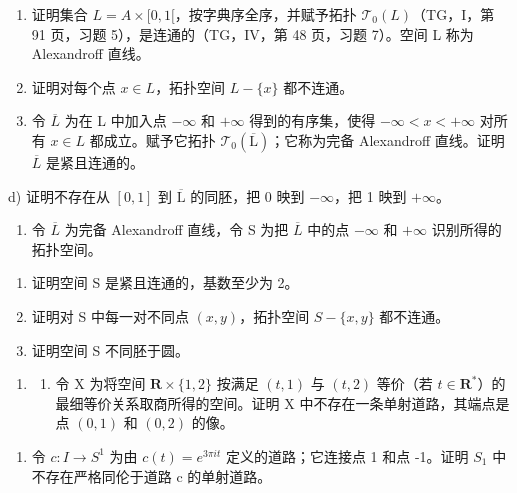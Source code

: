 \begin{enumerate}
\def\labelenumi{\alph{enumi})}
\item
  证明集合 \(L = A \times [0, 1[\)，按字典序全序，并赋予拓扑 \(\mathcal{T}_{0}(L)\)（TG，I，第 91 页，习题 5），是连通的（TG，IV，第 48 页，习题 7）。空间 L 称为 Alexandroff 直线。
\item
  证明对每个点 \(x \in L\)，拓扑空间 \(L - \{x\}\) 都不连通。
\item
  令 \(\overline{L}\) 为在 L 中加入点 \(-\infty\) 和 \(+\infty\) 得到的有序集，使得 \(-\infty < x < +\infty\) 对所有 \(x \in L\) 都成立。赋予它拓扑 \(\mathcal{T}_{0}(\overline{\mathrm{L}})\)；它称为完备 Alexandroff 直线。证明 \(\overline{L}\) 是紧且连通的。
\end{enumerate}

d) 证明不存在从 \([0,1]\) 到 \(\overline{\mathrm{L}}\) 的同胚，把 0 映到 \(-\infty\)，把 1 映到 \(+\infty\)。

\begin{enumerate}
\def\labelenumi{\arabic{enumi})}
\setcounter{enumi}{9}
\tightlist
\item
  令 \(\overline{L}\) 为完备 Alexandroff 直线，令 S 为把 \(\overline{L}\) 中的点 \(-\infty\) 和 \(+\infty\) 识别所得的拓扑空间。
\end{enumerate}

\begin{enumerate}
\def\labelenumi{\alph{enumi})}
\item
  证明空间 S 是紧且连通的，基数至少为 2。
\item
  证明对 S 中每一对不同点 \((x,y)\)，拓扑空间 \(S-\{x,y\}\) 都不连通。
\item
  证明空间 S 不同胚于圆。
\end{enumerate}

\begin{enumerate}
\def\labelenumi{\arabic{enumi})}
\setcounter{enumi}{10}
\tightlist
\item
  \begin{enumerate}
  \def\labelenumii{\alph{enumii})}
  \tightlist
  \item
    令 X 为将空间 \(\mathbf{R} \times \{1, 2\}\) 按满足 \((t, 1)\) 与 \((t, 2)\) 等价（若 \(t \in \mathbf{R}^*\)）的最细等价关系取商所得的空间。证明 X 中不存在一条单射道路，其端点是点 \((0, 1)\) 和 \((0, 2)\) 的像。
  \end{enumerate}
\end{enumerate}

\begin{enumerate}
\def\labelenumi{\alph{enumi})}
\setcounter{enumi}{1}
\tightlist
\item
  令 \(c: I \to S^{1}\) 为由 \(c(t) = e^{3\pi it}\) 定义的道路；它连接点 1 和点 -1。证明 \(S_{1}\) 中不存在严格同伦于道路 c 的单射道路。
\end{enumerate}

